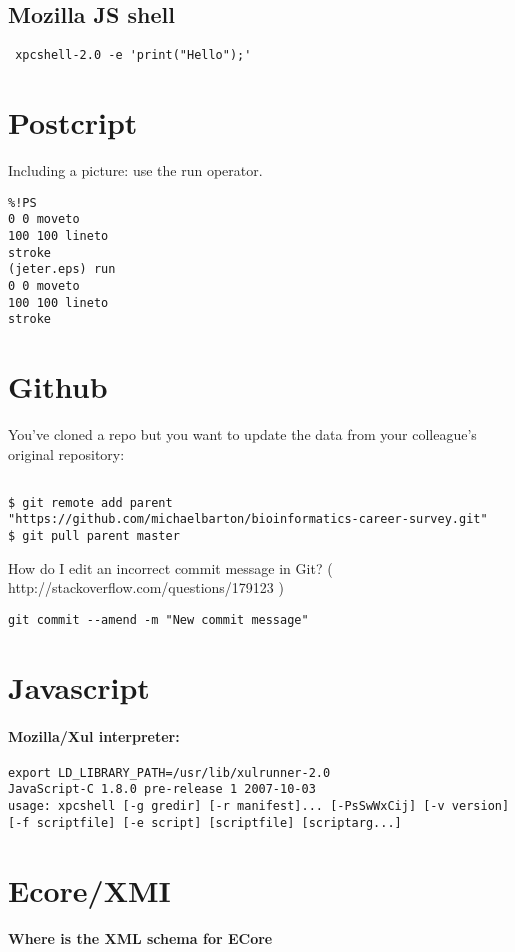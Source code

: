 \documentclass[12pt]{article}
\begin{document}
\subsection{Mozilla JS shell}
\begin{lstlisting}
 xpcshell-2.0 -e 'print("Hello");'
\end{lstlisting}
\section{Postcript}
Including a picture: use the run operator.
\begin{lstlisting}
%!PS
0 0 moveto
100 100 lineto
stroke
(jeter.eps) run
0 0 moveto
100 100 lineto
stroke
\end{lstlisting}
\section{Github}
You've cloned a repo but you want to update the data from your colleague's original repository:
\begin{lstlisting}

$ git remote add parent "https://github.com/michaelbarton/bioinformatics-career-survey.git"
$ git pull parent master
\end{lstlisting}


How do I edit an incorrect commit message in Git? ( http://stackoverflow.com/questions/179123 )
\begin{lstlisting}
git commit --amend -m "New commit message"
\end{lstlisting}

\section{Javascript}
\paragraph{Mozilla/Xul interpreter:}
\begin{lstlisting}
export LD_LIBRARY_PATH=/usr/lib/xulrunner-2.0
JavaScript-C 1.8.0 pre-release 1 2007-10-03
usage: xpcshell [-g gredir] [-r manifest]... [-PsSwWxCij] [-v version] [-f scriptfile] [-e script] [scriptfile] [scriptarg...]
\end{lstlisting}
\section{Ecore/XMI}
\paragraph{Where is the XML schema for ECore}
\end{document}
